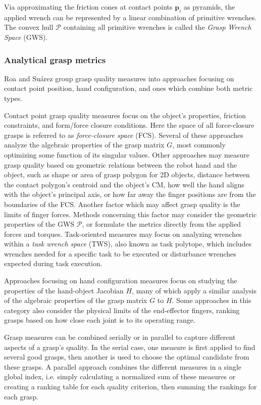 Via approximating the friction cones at contact points $ \boldsymbol{p}_i $ as pyramids, the applied wrench can be
represented by a linear combination of primitive wrenches. The convex hull $ \mathcal{P} $ containing all primitive
wrenches is called the \emph{Grasp Wrench Space} (GWS).

\subsubsection*{Analytical grasp metrics}

Roa and Su{\'a}rez \cite{Roa2015} group grasp quality measures into approaches focusing on contact point position, hand
configuration, and ones which combine both metric types.

Contact point grasp quality measures focus on the object's properties, friction constraints, and form/force closure
conditions. Here the space of all force-closure grasps is referred to as \emph{force-closure space} (FCS). Several of
these approaches analyze the algebraic properties of the grasp matrix $ G $, most commonly optimizing some function of
its singular values. Other approaches may measure grasp quality based on geometric relations between the robot hand and
the object, such as shape or area of grasp polygon for 2D objects, distance between the contact polygon's centroid and
the object's CM, how well the hand aligns with the object's principal axis, or how far away the finger positions are
from the boundaries of the FCS. Another factor which may affect grasp quality is the limits of finger forces. Methods
concerning this factor may consider the geometric properties of the GWS $ \mathcal{P} $, or formulate the metrics
directly from the applied forces and torques. Task-oriented measures may focus on analyzing wrenches within a
\emph{task wrench space} (TWS), also known as task polytope, which includes wrenches needed for a specific task to be
executed or disturbance wrenches expected during task execution.

Approaches focusing on hand configuration measures focus on studying the properties of the hand-object Jacobian $H$,
many of which apply a similar analysis of the algebraic properties of the grasp matrix $ G $ to $ H $. Some approaches
in this category also consider the physical limits of the end-effector fingers, ranking grasps based on how close each
joint is to its operating range.

Grasp measures can be combined serially or in parallel to capture different aspects of a grasp's quality. In the serial
case, one measure is first applied to find several good grasps, then another is used to choose the optimal candidate
from these grasps. A parallel approach combines the different measures in a single global index, i.e. simply calculating
a normalized sum of these measures or creating a ranking table for each quality criterion, then summing the rankings
for each grasp.

